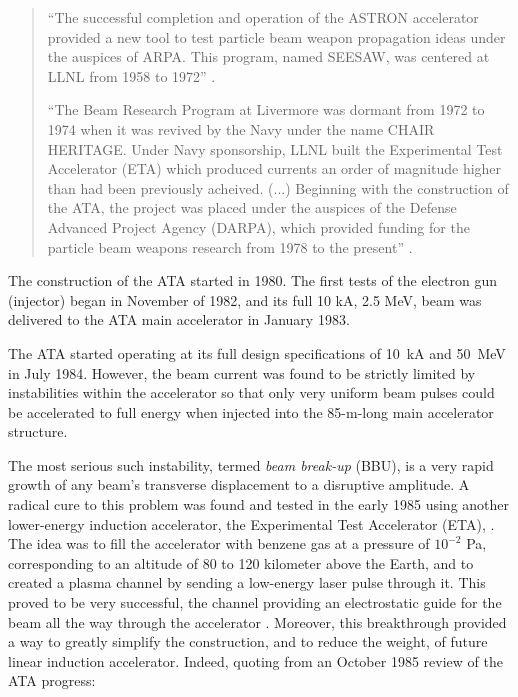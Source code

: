 \documentclass [12pt,a4paper,     ]{report} %
\begin{document}
\begin{quote}

``The successful completion and operation of the ASTRON accelerator \cite{CHRIS1964-} provided a new tool to test particle beam weapon propagation ideas under the auspices of ARPA.  This program, named SEESAW, was centered at LLNL from 1958 to 1972'' \cite[p.3]{SWING1985-}.

``The Beam Research Program at Livermore was dormant from 1972 to 1974 when it was revived by the Navy under the name CHAIR HERITAGE.  Under Navy sponsorship, LLNL built the Experimental Test Accelerator (ETA) which produced currents an order of magnitude higher than had been previously acheived. (...) Beginning with the construction of the ATA, the project was placed under the auspices of the Defense Advanced Project Agency (DARPA), which provided funding for the particle beam weapons research from 1978 to the present'' \cite[p.4]{SWING1985-}.

\end{quote}

The construction of the ATA started in 1980. The first tests of the electron gun (injector) began in November of 1982, and its full 10 kA, 2.5 MeV, beam was delivered to the ATA main accelerator in January 1983.

The ATA started operating at its full design specifications of 10~kA and 50~MeV in July 1984.  However, the beam current was found to be strictly limited by instabilities within the accelerator so that only very uniform beam pulses could be accelerated to full energy when injected into the 85-m-long main accelerator structure.


The most serious such instability, termed \emph{beam break-up} (BBU), is a very rapid growth of any beam's transverse displacement to a disruptive amplitude.  A radical cure to this problem was found and tested in the early 1985 using another lower-energy induction accelerator, the Experimental Test Accelerator (ETA), \cite{MARTI1985-, NEWSC1985-}.  The idea was to fill the accelerator with benzene gas at a pressure of $10^{-2}$ Pa, corresponding to an altitude of 80 to 120 kilometer above the Earth, and to created a plasma channel by sending a low-energy laser pulse through it.  This proved to be very successful, the channel providing an electrostatic guide for the beam all the way through the accelerator \cite{PRONO1985A}.  Moreover, this breakthrough provided a way to greatly simplify the construction, and to reduce the weight, of future linear induction accelerator.  Indeed, quoting from an October 1985 review of the ATA progress:
\end{document}
